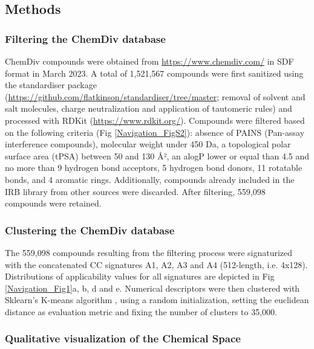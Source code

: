 \subsection{Methods}
\label{Navigation_Methods}



\subsubsection{Filtering the ChemDiv database}

ChemDiv compounds were obtained from \hyperlink{https://www.chemdiv.com/}{https://www.chemdiv.com/} in SDF format in March 2023. A total of 1,521,567 compounds were first sanitized using the standardiser package (\hyperlink{https://github.com/flatkinson/standardiser/tree/master}{https://github.com/flatkinson/standardiser/tree/master}; removal of solvent and salt molecules, charge neutralization and application of tautomeric rules) and processed with RDKit (\hyperlink{https://www.rdkit.org/}{https://www.rdkit.org/}). Compounds were filtered based on the following criteria (Fig \ref{Navigation_FigS2}): absence of PAINS\cite{baell_chemistry_2014} (Pan-assay interference compounds), molecular weight under 450 Da, a topological polar surface area (tPSA) between 50 and 130 Å², an alogP lower or equal than 4.5 and no more than 9 hydrogen bond acceptors, 5 hydrogen bond donors, 11 rotatable bonds, and 4 aromatic rings. Additionally, compounds already included in the IRB library from other sources were discarded. After filtering, 559,098 compounds were retained.


\subsubsection{Clustering the ChemDiv database}

The 559,098 compounds resulting from the filtering process were signaturized with the concatenated CC signatures A1, A2, A3 and A4 (512-length, i.e. 4x128). Distributions of applicability values for all signatures are depicted in Fig \ref{Navigation_Fig1}a, b, d and e. Numerical descriptors were then clustered with Sklearn’s K-means algorithm \cite{pedregosa_scikit-learn_2011}, using a random initialization, setting the euclidean distance as evaluation metric and fixing the number of clusters to 35,000. 

\subsubsection{Qualitative visualization of the Chemical Space}


